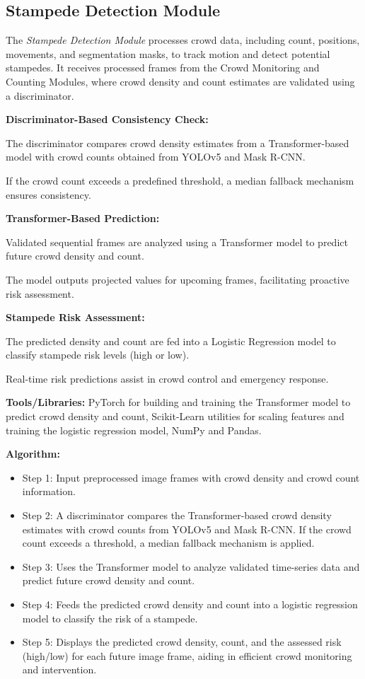 \documentclass[11pt]{report}
\begin{document}
\subsection{Stampede Detection Module}
The \textit{Stampede Detection Module} processes crowd data, including count, positions, movements, and segmentation masks, to track motion and detect potential stampedes. It receives processed frames from the Crowd Monitoring and Counting Modules, where crowd density and count estimates are validated using a discriminator.

\textbf{Discriminator-Based Consistency Check:}

The discriminator compares crowd density estimates from a Transformer-based model with crowd counts obtained from YOLOv5 and Mask R-CNN.

If the crowd count exceeds a predefined threshold, a median fallback mechanism ensures consistency.

\textbf{Transformer-Based Prediction:}

Validated sequential frames are analyzed using a Transformer model to predict future crowd density and count.

The model outputs projected values for upcoming frames, facilitating proactive risk assessment.

\textbf{Stampede Risk Assessment:}

The predicted density and count are fed into a Logistic Regression model to classify stampede risk levels (high or low).

Real-time risk predictions assist in crowd control and emergency response.

\textbf{Tools/Libraries:} PyTorch for building and training the Transformer model to predict crowd density and count, Scikit-Learn utilities for scaling features and training the logistic regression model, NumPy and Pandas.

\textbf{Algorithm:}
\begin{itemize}
  \item Step 1: Input preprocessed image frames with crowd density and crowd count information.
  \item Step 2: A discriminator compares the Transformer-based crowd density estimates with crowd counts from YOLOv5 and Mask R-CNN. If the crowd count exceeds a threshold, a median fallback mechanism is applied.
  \item Step 3: Uses the Transformer model to analyze validated time-series data and predict future crowd density and count.
  \item Step 4: Feeds the predicted crowd density and count into a logistic regression model to classify the risk of a stampede.
  \item Step 5: Displays the predicted crowd density, count, and the assessed risk (high/low) for each future image frame, aiding in efficient crowd monitoring and intervention.
\end{itemize}
\end{document}
